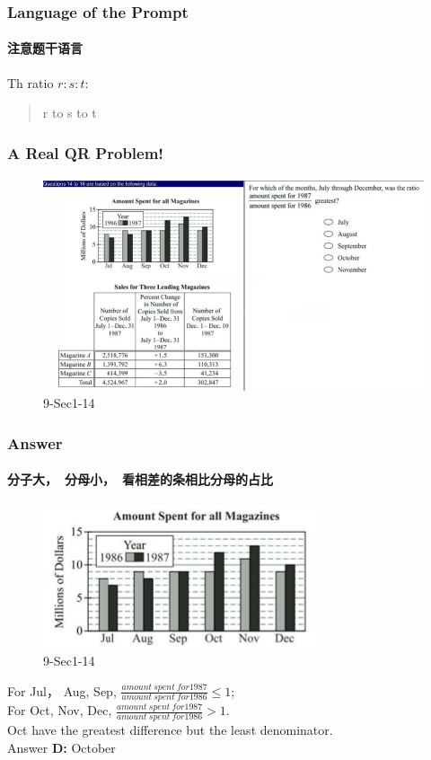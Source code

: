 \documentclass[
	11pt, %
	handout,
]{beamer}
\begin{document}

\begin{frame}
	\frametitle{Language of the Prompt}
	\framesubtitle{注意题干语言}
	{\LARGE Th ratio $r:s:t$:} 
	\begin{quote}
	{\LARGE r to s to t}
	\end{quote}
\end{frame}


\begin{frame}
	\frametitle{A Real QR Problem!}
	\framesubtitle{}
	\begin{figure}
		\includegraphics[width=\linewidth]{Ratio_Example_Question1.png}
		\caption{9-Sec1-14}
	\end{figure}

\end{frame}


\begin{frame}
	\frametitle{Answer}
	\framesubtitle{分子大，\ 分母小，\ 看相差的条相比分母的占比}

	\begin{figure}
		\includegraphics[width=0.5\linewidth]{Ratio_Example_Question1_1.png}
		\caption{9-Sec1-14}
	\end{figure}

For Jul， Aug, Sep, $\frac{amount \ spent \ for 1987}{amount \ spent \ for 1986} \leq 1$; \\
For Oct, Nov, Dec, $\frac{amount \ spent \ for 1987}{amount \ spent \ for 1986} > 1$. \\
Oct have the greatest difference but the least denominator. \\


	

\bigskip
Answer \textbf{D: } October\\
\end{frame}
\end{document}

